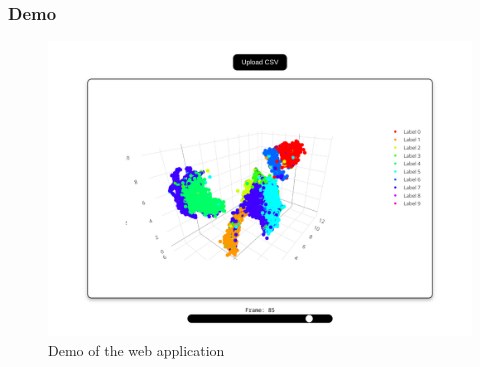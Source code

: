 \documentclass[aspectratio=169]{beamer}
\begin{document}
\begin{frame}
	\frametitle{Demo}

	\begin{figure}
		\includegraphics[scale=.23]{fig/demo.png}
		\caption{Demo of the web application}
	\end{figure}
	
\end{frame}
\end{document}
